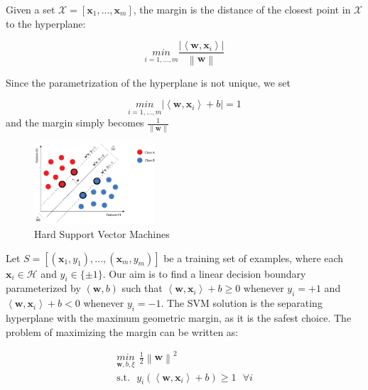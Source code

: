 \documentclass{article}
\begin{document}
Given a set $\mathcal{X} = [\textbf{x}_{1},...,\textbf{x}_{m}]$, the margin is the distance of the closest point in $\mathcal{X}$ to the hyperplane:

\begin{equation}
\underset{i=1,...,m}{min}\frac{| \left \langle \textbf{w},\textbf{x}_{i} \right \rangle |}{\left \| \textbf{w} \right \|} 
\end{equation}

Since the parametrization of the hyperplane is not unique, we set

\begin{equation}
\underset{i=1,...,m}{min} | \left \langle \textbf{w},\textbf{x}_{i} \right \rangle +b | = 1 \end{equation}
and the margin simply becomes $\frac{1}{\left \| \textbf{w}  \right \|}$

\begin{figure}[h]
\centering
\includegraphics[width=0.4\textwidth]{hardmargin.png}
\caption{Hard Support Vector Machines}
\end{figure}

Let $S = [(\textbf{x}_{1}, y_{1}), ..., (\textbf{x}_{m}, y_{m})]$ be a training set of examples, where each $\textbf{x}_{i} \in \mathcal{H}$ and $y_{i} \in \{\pm1\}$. Our aim is to find a linear decision boundary parameterized by $(\textbf{w},b)$ such that $\left \langle \textbf{w},\textbf{x}_{i} \right \rangle + b \geq 0$ whenever $y_{i} = +1$ and  $\left \langle \textbf{w},\textbf{x}_{i} \right \rangle + b < 0$ whenever $y_{i} = -1$. The SVM solution is the separating hyperplane with the maximum geometric margin, as it is the safest choice. The problem of maximizing the margin can be written as:


\begin{equation}
\begin{aligned}
\underset{\textbf{w},b, \xi}{min} ~~ \frac{1}{2}\left \| \textbf{w} \right \|^{2} \\ \textrm{s.t.}~~~ y_{i}( \left \langle \textbf{w}, \textbf{x}_{i} \right \rangle + b)\geq 1 ~~~ \forall i
\end{aligned}
\end{equation}
\end{document}
